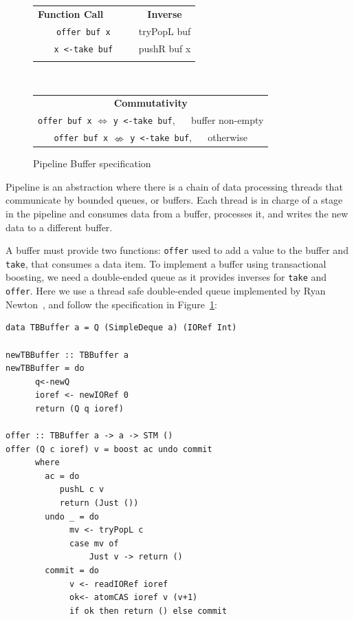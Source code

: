 \documentclass{llncs}
\newcommand{\spc}{\quad \!\!\!\!}
\begin{document}
\begin{figure}[!ht]
\begin{center}
\begin{tabular}{ c c }
  {\bf Function Call}  $\spc$  $\spc$ &  {\bf Inverse}  \\
  {\tt offer buf x}  & tryPopL buf \\
  {\tt x <-take buf} & pushR buf x  \\
&\\
\end{tabular}\\
\begin{tabular}{ c }
  {\bf Commutativity}  \\
  {\tt offer buf x} $\Leftrightarrow$ {\tt y <-take buf},  $\spc$ buffer non-empty\\
 {\tt offer buf x} $\nLeftrightarrow$ {\tt y <-take buf},  $\spc$ otherwise\\
\end{tabular}
\end{center}
\caption{Pipeline Buffer specification}
\label{fig:buffer}
\end{figure}



Pipeline is an abstraction where there is a chain of data processing threads that
communicate by bounded queues, or buffers. 
Each thread is in charge of a stage in the pipeline and consumes data from a buffer, processes
it, and writes the new data to a different buffer.




A buffer must provide two functions: {\tt offer} used to add a value to the buffer and {\tt take},
that consumes a data item. To implement a buffer using transactional boosting, we need a 
 double-ended queue  as it
provides  inverses for
{\tt take} and {\tt offer}. Here we use a thread safe double-ended queue implemented by Ryan Newton~\cite{pdqueue}, 
 and follow the specification in Figure~\ref{fig:buffer}:

{\small\begin{verbatim}
data TBBuffer a = Q (SimpleDeque a) (IORef Int)

newTBBuffer :: TBBuffer a
newTBBuffer = do 	
      q<-newQ
      ioref <- newIORef 0
      return (Q q ioref)

offer :: TBBuffer a -> a -> STM ()
offer (Q c ioref) v = boost ac undo commit
      where
        ac = do
           pushL c v
           return (Just ())
        undo _ = do
             mv <- tryPopL c
             case mv of
                 Just v -> return ()
        commit = do
             v <- readIORef ioref		
             ok<- atomCAS ioref v (v+1)
             if ok then return () else commit
\end{verbatim}}
\end{document}
